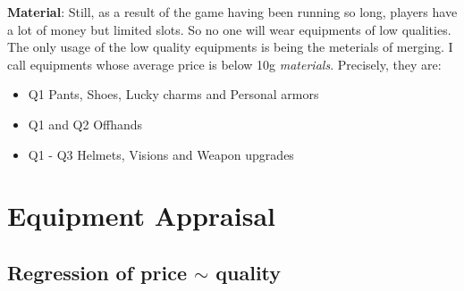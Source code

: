\documentclass{manuscript}
\begin{document}
    \textbf{Material}: Still, as a result of the game having been running so long, players have a lot of money but limited
    slots. So no one will wear equipments of low qualities. The only usage of the low quality equipments is being the
    meterials of merging. I call equipments whose average price is below 10g \textit{materials}. Precisely, they are:
    \begin{itemize}[nosep]
        \item Q1 Pants, Shoes, Lucky charms and Personal armors
        \item Q1 and Q2 Offhands
        \item Q1 - Q3 Helmets, Visions and Weapon upgrades
    \end{itemize}

    \section{Equipment Appraisal}

    \subsection{Regression of price $\sim$ quality}
\end{document}
